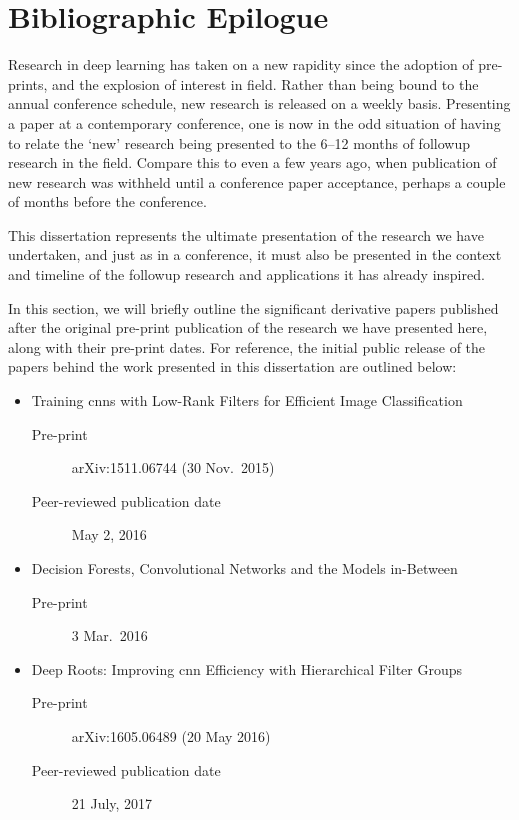 \documentclass[thesis]{subfiles}
\begin{document}

\chapter{Bibliographic Epilogue}
\label{epilogue}
Research in deep learning has taken on a new rapidity since the adoption of pre-prints, and the explosion of interest in field. Rather than being bound to the annual conference schedule, new research is released on a weekly basis. Presenting a paper at a contemporary conference, one is now in the odd situation of having to relate the `new' research being presented to the 6--12 months of followup research in the field. Compare this to even a few years ago, when publication of new research was withheld until a conference paper acceptance, perhaps a couple of months before the conference.

This dissertation represents the ultimate presentation of the research we have undertaken, and just as in a conference, it must also be presented in the context and timeline of the followup research and applications it has already inspired.

In this section, we will briefly outline the significant derivative papers published after the original pre-print publication of the research we have presented here, along with their pre-print dates. For reference, the initial public release of the papers behind the work presented in this dissertation are outlined below:

\begin{itemize}
    \item Training \glspl{cnn} with Low-Rank Filters for Efficient Image Classification~\citep{Ioannou2016}
    \begin{description}
        \item[Pre-print] arXiv:1511.06744 (30 Nov.\ 2015)
        \item[Peer-reviewed publication date] May 2, 2016
    \end{description}
    \item Decision Forests, Convolutional Networks and the Models in-Between~\citep{Ioannou2015}
    \begin{description}
        \item[Pre-print] 3 Mar.\ 2016
    \end{description}
    \item Deep Roots: Improving \gls{cnn} Efficiency with Hierarchical Filter Groups~\citep{ioannou2016e}
    \begin{description}
        \item[Pre-print] arXiv:1605.06489 (20 May 2016)
        \item[Peer-reviewed publication date] 21 July, 2017
    \end{description}
\end{itemize}
\end{document}
